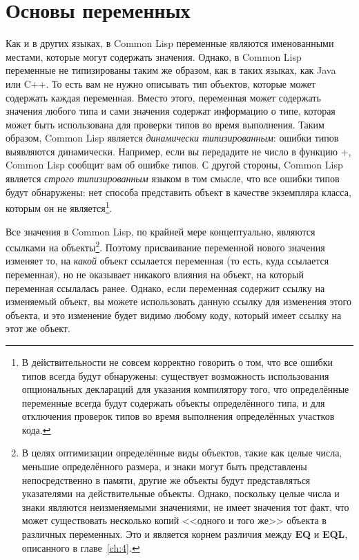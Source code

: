 \section{Основы переменных}

Как и в других языках, в Common Lisp переменные являются именованными местами, которые
могут содержать значения. Однако, в Common Lisp переменные не типизированы таким же
образом, как в таких языках, как Java или C++. То есть вам не нужно описывать тип
объектов, которые может содержать каждая переменная. Вместо этого, переменная может
содержать значения любого типа и сами значения содержат информацию о типе, которая может
быть использована для проверки типов во время выполнения. Таким образом, Common Lisp
является \textit{динамически типизированным}: ошибки типов выявляются
динамически. Например, если вы передадите не число в функцию +, Common Lisp сообщит вам об
ошибке типов. С другой стороны, Common Lisp является \textit{строго типизированным} языком
в том смысле, что все ошибки типов будут обнаружены: нет способа представить объект в
качестве экземпляра класса, которым он не является\footnote{В действительности не совсем
  корректно говорить о том, что все ошибки типов всегда будут обнаружены: существует
  возможность использования опциональных деклараций для указания компилятору того, что
  определённые переменные всегда будут содержать объекты определённого типа, и для
  отключения проверок типов во время выполнения определённых участков кода.}.

Все значения в Common Lisp, по крайней мере концептуально, являются ссылками на
объекты\footnote{В целях оптимизации определённые виды объектов, такие как целые числа,
  меньшие определённого размера, и знаки могут быть представлены непосредственно в памяти,
  другие же объекты будут представляться указателями на действительные объекты. Однако,
  поскольку целые числа и знаки являются неизменяемыми значениями, не имеет значения тот
  факт, что может существовать несколько копий <<одного и того же>> объекта в различных
  переменных. Это и является корнем различия между \textbf{EQ} и \textbf{EQL}, описанного
  в главе~\ref{ch:4}.}. Поэтому присваивание переменной нового значения изменяет то, на
  \textit{какой} объект ссылается переменная (то есть, куда ссылается переменная), но не
  оказывает никакого влияния на объект, на который переменная ссылалась ранее. Однако,
  если переменная содержит ссылку на изменяемый объект, вы можете использовать данную
  ссылку для изменения этого объекта, и это изменение будет видимо любому коду, который
  имеет ссылку на этот же объект.

